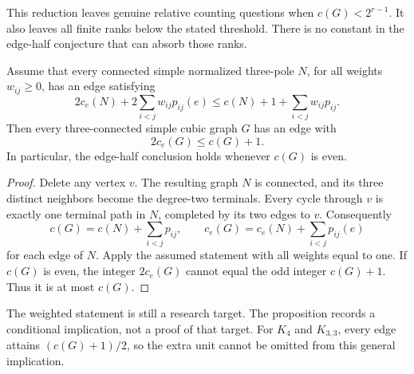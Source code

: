 This reduction leaves genuine relative counting questions when $c(G)<2^{r-1}$.
It also leaves all finite ranks below the stated threshold.
There is no constant in the edge-half conjecture that can absorb those ranks.

\begin{proposition}
\label{prop:new-tripole-near-half}
Assume that every connected simple normalized three-pole $N$, for all weights $w_{ij}\ge0$, has an edge satisfying
\[
 2c_e(N)+2\sum_{i<j}w_{ij}p_{ij}(e)
 \le c(N)+1+\sum_{i<j}w_{ij}p_{ij}.
\]
Then every three-connected simple cubic graph $G$ has an edge with
\[
 2c_e(G)\le c(G)+1.
\]
In particular, the edge-half conclusion holds whenever $c(G)$ is even.
\end{proposition}

\begin{proof}
Delete any vertex $v$.
The resulting graph $N$ is connected, and its three distinct neighbors become the degree-two terminals.
Every cycle through $v$ is exactly one terminal path in $N$, completed by its two edges to $v$.
Consequently
\[
 c(G)=c(N)+\sum_{i<j}p_{ij},\qquad
 c_e(G)=c_e(N)+\sum_{i<j}p_{ij}(e)
\]
for each edge of $N$.
Apply the assumed statement with all weights equal to one.
If $c(G)$ is even, the integer $2c_e(G)$ cannot equal the odd integer $c(G)+1$.
Thus it is at most $c(G)$.
\end{proof}

The weighted statement is still a research target.
The proposition records a conditional implication, not a proof of that target.
For $K_4$ and $K_{3,3}$, every edge attains $(c(G)+1)/2$, so the extra unit cannot be omitted from this general implication.
